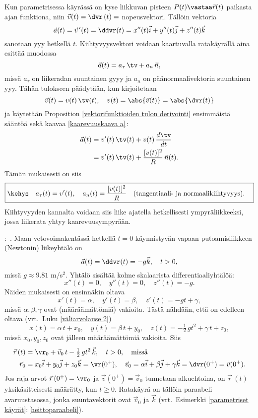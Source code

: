 Kun parametrisessa käyrässä on kyse liikkuvan pisteen $P(t) \vastaa \vec r(t)$ paikasta ajan 
funktiona, niin $\vec v(t)=\dvr\,(t)=$ nopeusvektori. Tällöin vektoria
\[ 
\vec a(t) = \vec v\,'(t) = \ddvr(t) = x''(t)\vec i + y''(t)\vec j + z''(t)\vec k 
\]
sanotaan yyy hetkellä $t$. Kiihtyvyysvektori voidaan kaartuvalla
ratakäyrällä aina esittää muodossa
\[ 
\vec a(t) = a_\tau\,\tv + a_n\,\vec n, 
\]
missä $a_\tau$ on liikeradan suuntainen gyyy ja $a_n$
on päänormaalivektorin suuntainen yyy. Tähän tulokseen 
päädytään, kun kirjoitetaan
\[
\vec v(t)=v(t)\,\tv(t),\quad v(t)=\abs{\vec v(t)}=\abs{\dvr(t)}
\]
ja käytetään Proposition \ref{vektorifunktioiden tulon derivointi} ensimmäistä sääntöä sekä
kaavaa \eqref{kaarevuuskaava a}\,:
\begin{align*}
\vec a(t) &= v'(t)\,\tv(t)+v(t)\,\frac{d\tv}{dt} \\
          &=v'(t)\,\tv(t)+\frac{[v(t)]^2}{R}\,\vec n(t).
\end{align*}
Tämän mukaisesti on siis
\[ \boxed{\kehys\quad a_\tau(t) 
          = v'(t), \quad a_n(t) 
          = \frac{[v(t)]^2}{R} \quad \text{(tangentiaali- ja normaalikiihtyvyys)}. \quad} 
\]
Kiihtyvyyden kannalta voidaan siis liike ajatella hetkellisesti ympyräliikkeeksi, jossa 
liikerata yhtyy kaarevuusympyrään.
%
\begin{Exa}:\ . Maan vetovoimakentässä hetkellä $t=0$ käynnistyvän
vapaan putoamisliikkeen (Newtonin) liikeyhtälö on
\[ 
\vec a(t) = \ddvr(t) = -g\vec k, \quad t>0, 
\]
missä $g \approx 9.81$ m/s$^2$. Yhtälö sisältää kolme skalaarista differentiaaliyhtälöä:
\[ 
x''(t) = 0, \quad y''(t) = 0, \quad z''(t) = -g. 
\]
Näiden mukaisesti on ensinnäkin oltava
\[ 
x'(t) = \alpha, \quad y'(t) = \beta, \quad z'(t) = -gt + \gamma, 
\]
missä $\alpha,\beta,\gamma$ ovat (määräämättömiä) vakioita. Tästä nähdään, että on edelleen
oltava (vrt.\ Luku \ref{väliarvolause 2})
\[ 
x(t) = \alpha\,t + x_0, \quad y(t) = \beta\,t + y_0, \quad 
                              z(t) = -\tfrac{1}{2}\,gt^2 + \gamma\,t + z_0, 
\]
missä $x_0,y_0,z_0$ ovat jälleen määräämättömiä vakioita. Siis
\begin{align*}
\vec r\,(t)&= \vr_0 + \vec v_0\,t - \tfrac{1}{2}\,gt^2\,\vec k, \quad t>0, \quad \text{missä} \\
\vec r_0   &= x_0\vec i + y_0\vec j + z_0\vec k = \vr(0^+), \quad 
   \vec v_0 = \alpha\vec i + \beta\vec j + \gamma\vec k = \dvr(0^+) = \vec v(0^+). 
\end{align*}
Jos raja-arvot $\vec r\,(0^+)=\vr_0$ ja $\vec v(0^+) = \vec v_0$ tunnetaan alkuehtoina, on
$\vec r\,(t)$ yksikäsitteisesti määrätty, kun $t \ge 0$. Ratakäyrä on tällöin paraabeli
avaruustasossa, jonka suuntavektorit ovat $\vec v_0$ ja $\vec k$
(vrt.\ Esimerkki \ref{parametriset käyrät}:\,\ref{heittoparaabeli}). \loppu 
\end{Exa}
